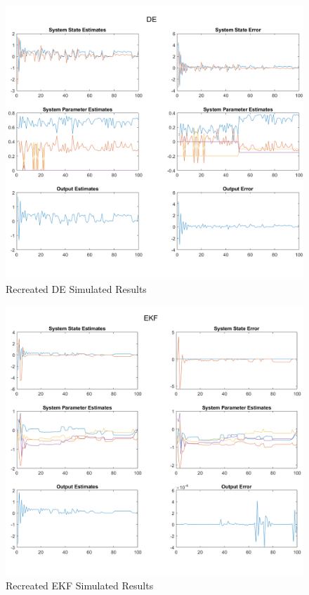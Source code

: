 \documentclass[]{ieeetran}
\begin{document}
\begin{figure}
	\centering
	\includegraphics[width=\linewidth]{../../fig/DE_no_attack}
	\caption{Recreated DE Simulated Results}
	\label{fig:denoattack}
\end{figure}

\begin{figure}
	\centering
	\includegraphics[width=\linewidth]{../../fig/EKF_no_attack}
	\caption{Recreated EKF Simulated Results}
	\label{fig:ekfnoattack}
\end{figure}
\end{document}
